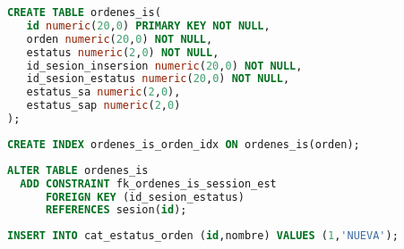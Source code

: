 \begin{lstlisting}[language=SQL, caption={Sentencia para crear una tabla.}, label={lst:sql-create-table}]
CREATE TABLE ordenes_is(
   id numeric(20,0) PRIMARY KEY NOT NULL,
   orden numeric(20,0) NOT NULL,
   estatus numeric(2,0) NOT NULL,
   id_sesion_insersion numeric(20,0) NOT NULL,
   id_sesion_estatus numeric(20,0) NOT NULL,
   estatus_sa numeric(2,0),
   estatus_sap numeric(2,0)
);
\end{lstlisting}

\begin{lstlisting}[language=SQL, caption={Sentencia para crear un índice.}, label={lst:sql-create-index}]
CREATE INDEX ordenes_is_orden_idx ON ordenes_is(orden);
\end{lstlisting}

\begin{lstlisting}[language=SQL, caption={Sentencia para crear una llave foránea.}, label={lst:sql-create-fk}]
ALTER TABLE ordenes_is 
  ADD CONSTRAINT fk_ordenes_is_session_est 
      FOREIGN KEY (id_sesion_estatus)
      REFERENCES sesion(id);
\end{lstlisting}

\begin{lstlisting}[language=SQL, caption={Sentencia insertar un registro.}, label={lst:sql-insert}]
INSERT INTO cat_estatus_orden (id,nombre) VALUES (1,'NUEVA');
\end{lstlisting}
